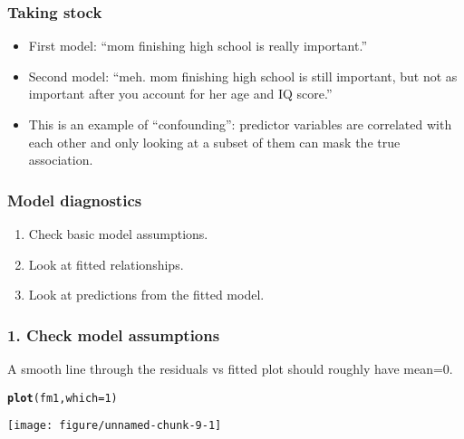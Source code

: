 \documentclass[table]{beamer}\usepackage[]{graphicx}\usepackage[]{color}
\makeatletter
\def\maxwidth{ %
  \ifdim\Gin@nat@width>\linewidth
    \linewidth
  \else
    \Gin@nat@width
  \fi
}
\newcommand{\hlnum}[1]{\textcolor[rgb]{0.686,0.059,0.569}{#1}}%
\newcommand{\hlstd}[1]{\textcolor[rgb]{0.345,0.345,0.345}{#1}}%
\newcommand{\hlkwc}[1]{\textcolor[rgb]{0.333,0.667,0.333}{#1}}%
\newcommand{\hlkwd}[1]{\textcolor[rgb]{0.737,0.353,0.396}{\textbf{#1}}}%
\newenvironment{kframe}{%
 \def\at@end@of@kframe{}%
 \ifinner\ifhmode%
  \def\at@end@of@kframe{\end{minipage}}%
  \begin{minipage}{\columnwidth}%
 \fi\fi%
 \def\FrameCommand##1{\hskip\@totalleftmargin \hskip-\fboxsep
 \colorbox{shadecolor}{##1}\hskip-\fboxsep
     \hskip-\linewidth \hskip-\@totalleftmargin \hskip\columnwidth}%
 \MakeFramed {\advance\hsize-\width
   \@totalleftmargin\z@ \linewidth\hsize
   \@setminipage}}%
 {\par\unskip\endMakeFramed%
 \at@end@of@kframe}
\newenvironment{knitrout}{}{} %
\makeatother
\begin{document}


\begin{frame}[fragile]
\frametitle{Taking stock}

\begin{itemize}
\item First model: ``mom finishing high school is really important.''
\item Second model: ``meh. mom finishing high school is still important, but not as important after you account for her age and IQ score.''
\item This is an example of ``confounding'': predictor variables are correlated with each other and only looking at a subset of them can mask the true association.
\end{itemize}

\end{frame}



\begin{frame}[fragile]
\frametitle{Model diagnostics}

\begin{enumerate}
\item Check basic model assumptions.
\item Look at fitted relationships.
\item Look at predictions from the fitted model.
\end{enumerate}

\end{frame}



\begin{frame}[fragile]
\frametitle{1. Check model assumptions}

A smooth line through the residuals vs fitted plot should roughly have mean=0.

\begin{knitrout}
\color{fgcolor}\begin{kframe}
\begin{alltt}
\hlkwd{plot}\hlstd{(fm1,} \hlkwc{which} \hlstd{=} \hlnum{1}\hlstd{)}
\end{alltt}
\end{kframe}
\texttt{[image: figure/unnamed-chunk-9-1]} 
\end{knitrout}

\end{frame}
\end{document}
